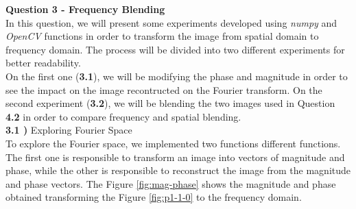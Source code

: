 \documentclass[12pt,a4paper]{article}
\begin{document}
\textbf{\LARGE Question 3 - Frequency Blending} \\

In this question, we will present some experiments developed using \emph{numpy} and \emph{OpenCV} functions in order to transform the image from spatial domain to frequency domain. The process will be divided into two different experiments for better readability. \\

On the first one (\textbf{3.1}), we will be modifying the phase and magnitude in order to see the impact on the image recontructed on the Fourier transform. On the second experiment (\textbf{3.2}), we will be blending the two images used in Question \textbf{4.2} in order to compare frequency and spatial blending. \\

\textbf{3.1 )} Exploring Fourier Space \\

To explore the Fourier space, we implemented two functions different functions. The first one is responsible to transform an image into vectors of magnitude and phase, while the other is responsible to reconstruct the image from the magnitude and phase vectors. The Figure \ref{fig:mag-phase} shows the magnitude and phase obtained transforming the Figure \ref{fig:p1-1-0} to the frequency domain. \\
\end{document}
